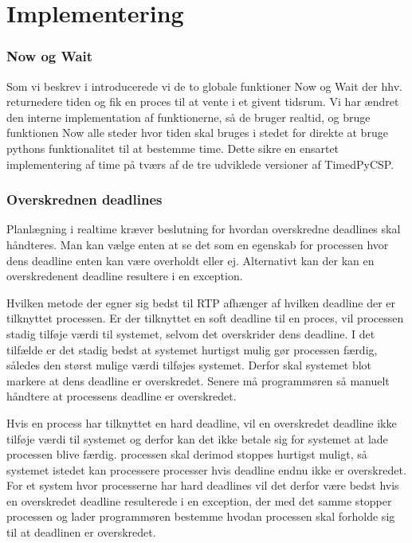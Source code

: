 \section{Implementering}

\subsubsection{Now og Wait}
Som vi beskrev i \des introducerede vi de to globale funktioner Now og Wait der hhv. returnedere tiden og fik en proces til at vente i et givent tidsrum. Vi har ændret den interne implementation af funktionerne, så de bruger realtid, og bruge funktionen Now alle steder hvor tiden skal bruges i stedet  for direkte at bruge pythons funktionalitet til at bestemme time. Dette sikre en ensartet implementering af time på tværs af de tre udviklede versioner af TimedPyCSP.

\subsubsection{Overskrednen deadlines}
Planlægning i realtime kræver beslutning for hvordan  overskredne deadlines skal håndteres. Man kan vælge enten at se det som en egenskab for processen hvor dens deadline enten kan være overholdt eller ej. Alternativt kan der kan en overskredenent deadline resultere i en exception.

Hvilken metode der egner sig bedst til RTP afhænger af hvilken deadline der er tilknyttet processen. Er der tilknyttet en soft deadline til en proces, vil processen stadig tilføje værdi til systemet, selvom det  overskrider dens deadline. I det tilfælde er det stadig bedst at systemet hurtigst mulig gør processen færdig, således den størst mulige værdi tilføjes systemet. Derfor skal systemet blot markere at dens deadline er overskredet. Senere må programmøren så manuelt håndtere at processens deadline er overskredet. 


Hvis en process har tilknyttet  en hard deadline, vil en overskredet deadline  ikke tilføje værdi til systemet og derfor kan det ikke betale sig for systemet at lade processen blive færdig. processen skal derimod stoppes hurtigst muligt, så systemet istedet kan processere processer hvis deadline endnu ikke er overskredet. For et system hvor processerne har hard deadlines vil det derfor være bedst hvis en overskredet deadline resulterede i en exception, der med det samme stopper processen og lader programmøren bestemme hvodan processen skal forholde sig til at deadlinen er overskredet.

